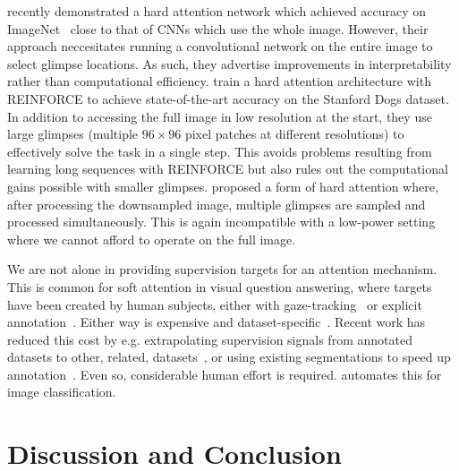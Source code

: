  \cite{elsayed2019saccader} recently
demonstrated a hard attention network which achieved accuracy on
ImageNet~\cite{imagenet} close to that of CNNs which use the whole image.
However, their approach neccesitates running a convolutional network on the
entire image to select glimpse locations. As such, they advertise improvements
in interpretability rather than computational efficiency.
\cite{sermanet2014attention} train a hard attention architecture with REINFORCE
to achieve state-of-the-art accuracy on the Stanford Dogs dataset. In addition
to accessing the full image in low resolution at the start, they use large
glimpses (multiple $96\times96$ pixel patches at different resolutions) to
effectively solve the task in a single step. This avoids problems resulting from
learning long sequences with REINFORCE but also rules out the computational
gains possible with smaller glimpses. \cite{katharopoulos2019processing}
proposed a form of hard attention where, after processing the downsampled image,
multiple glimpses are sampled and processed simultaneously. This is again
incompatible with a low-power setting where we cannot afford to operate on the
full image.




 We are not alone in providing supervision
targets for an attention mechanism. This is common for soft attention in visual
question answering, where targets have been created by human subjects, either
with gaze-tracking~\cite{yu2017supervising} or explicit
annotation~\cite{das2017human}. Either way is expensive and
dataset-specific~\cite{das2017human, gan2017vqs}. Recent work has reduced this
cost by e.g. extrapolating supervision signals from annotated datasets to other,
related, datasets~\cite{qiao2018exploring}, or using existing segmentations to
speed up annotation~\cite{gan2017vqs}. Even so, considerable human effort is
required. \PSNOGS{} automates this for image classification.


\section{Discussion and Conclusion}

